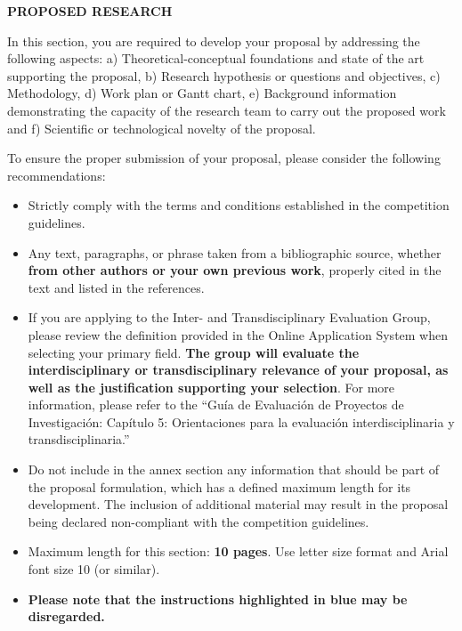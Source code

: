 \documentclass[demo, MAIN.tex]{subfiles}
\begin{document}
\noindent\textbf{PROPOSED RESEARCH}

\medskip

\begin{tcolorbox}[instructions]
  In this section, you are required to develop your proposal by addressing the following aspects: a) Theoretical-conceptual foundations and state of the art supporting the proposal, b) Research hypothesis or questions and objectives, c) Me\-tho\-do\-lo\-gy, d) Work plan or Gantt chart, e) Background information demonstrating the capacity of the research team to carry out the proposed work and f) Scientific or technological novelty of the proposal.

  \color{fondecytblue}
  \medskip

  To ensure the proper submission of your proposal, please consider the following recommendations:
  \begin{itemize}[dashitem]
  \item Strictly comply with the terms and conditions established in the competition guidelines.
  \item Any text, paragraphs, or phrase taken from a bibliographic source, whether \textbf{from other authors or your own previous work}, properly cited in the text and listed in the references.
  \item If you are applying to the Inter- and Transdisciplinary Evaluation Group, please review the definition provided in the Online Application System when selecting your primary field. \textbf{The group will evaluate the interdisciplinary or transdisciplinary relevance of your proposal, as well as the justification supporting your selection}. For more information, please refer to the ``Guía de Evaluación de Proyectos de Investigación: Capítulo 5: Orientaciones para la evaluación interdisciplinaria y transdisciplinaria.''
    \item Do not include in the annex section any information that should be part of the proposal formulation, which has a defined maximum length for its development. The inclusion of additional material may result in the proposal being declared non-compliant with the competition guidelines.
    \item Maximum length for this section: \textbf{10 pages}. Use letter size format and Arial font size 10 (or similar).
    \item \textbf{Please note that the instructions highlighted in blue may be disregarded.}
  \end{itemize}
\end{tcolorbox}
\end{document}
